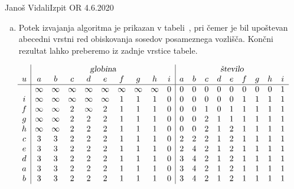 \begin{naloga}{Janoš Vidali}{Izpit OR 4.6.2020}
\begin{odgovor}
\begin{enumerate}[(a)]
\item Potek izvajanja algoritma je prikazan v tabeli~\tab,
pri čemer je bil upoštevan abecedni vrstni red
obiskovanja sosedov posameznega vozlišča.
Končni rezultat lahko preberemo iz zadnje vrstice tabele.
\end{enumerate}
%
\begin{tabela}
$$
\begin{array}{c|ccccccccc|ccccccccc}
& \multicolumn{9}{c|}{\text{\sl globina}}
& \multicolumn{9}{c}{\text{\sl število}} \\
u & a & b & c & d & e & f & g & h & i & a & b & c & d & e & f & g & h & i \\
\hline
& \infty & \infty & \infty & \infty & \infty & \infty & \infty & \infty & 0
& 0 & 0 & 0 & 0 & 0 & 0 & 0 & 0 & 1 \\
i & \infty & \infty & \infty & \infty & \infty & 1 & 1 & 1 & 0
& 0 & 0 & 0 & 0 & 0 & 1 & 1 & 1 & 1 \\
f & \infty & \infty & 2 & \infty & 2 & 1 & 1 & 1 & 0
& 0 & 0 & 1 & 0 & 1 & 1 & 1 & 1 & 1 \\
g & \infty & \infty & 2 & 2 & 2 & 1 & 1 & 1 & 0
& 0 & 0 & 2 & 1 & 1 & 1 & 1 & 1 & 1 \\
h & \infty & \infty & 2 & 2 & 2 & 1 & 1 & 1 & 0
& 0 & 0 & 2 & 1 & 2 & 1 & 1 & 1 & 1 \\
c & 3 & 3 & 2 & 2 & 2 & 1 & 1 & 1 & 0
& 2 & 2 & 2 & 1 & 2 & 1 & 1 & 1 & 1 \\
e & 3 & 3 & 2 & 2 & 2 & 1 & 1 & 1 & 0
& 2 & 4 & 2 & 1 & 2 & 1 & 1 & 1 & 1 \\
d & 3 & 3 & 2 & 2 & 2 & 1 & 1 & 1 & 0
& 3 & 4 & 2 & 1 & 2 & 1 & 1 & 1 & 1 \\
a & 3 & 3 & 2 & 2 & 2 & 1 & 1 & 1 & 0
& 3 & 4 & 2 & 1 & 2 & 1 & 1 & 1 & 1 \\
b & 3 & 3 & 2 & 2 & 2 & 1 & 1 & 1 & 0
& 3 & 4 & 2 & 1 & 2 & 1 & 1 & 1 & 1
\end{array}
$$
\end{tabela}
\end{odgovor}
\end{naloga}
